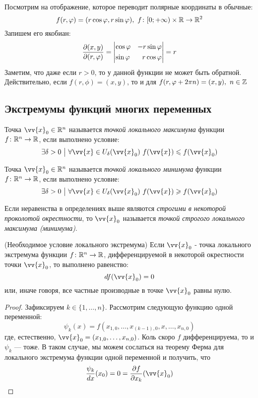 \begin{example}
	Посмотрим на отображение, которое переводит полярные координаты в обычные:
	\[
		f(r, \varphi) = (r\cos\varphi, r\sin\varphi),\ f \colon [0; +\infty) \times \mathbb{R} \to \mathbb{R}^2
	\]
	Запишем его якобиан:
	\[
		\frac{\partial (x, y)}{\partial (r, \varphi)} = \left|\begin{aligned}&{\cos\varphi} &{-r\sin\varphi} \\ &{\sin\varphi} &{r\cos\varphi}\end{aligned}\right| = r
	\]
	Заметим, что даже если $r > 0$, то у данной функции не может быть обратной. Действительно, если $f(r, \phi) = (x, y)$, то и для $f(r, \varphi + 2\pi n) = (x, y),\ n \in \mathbb{Z}$
\end{example}

\subsection{Экстремумы функций многих переменных}

\begin{definition}
	Точка $\vv{x}_0 \in \R^n$ называется \textit{точкой локального максимума} функции $f \colon \mathbb{R}^n \to \mathbb{R}$, если выполнено условие:
	\[
		\exists \delta > 0 \such \forall \vv{x} \in U_\delta(\vv{x}_0)\ f(\vv{x}) \le f(\vv{x}_0)
	\]
\end{definition}

\begin{definition}
	Точка $\vv{x}_0 \in \R^n$ называется \textit{точкой локального минимума} функции $f \colon \mathbb{R}^n \to \mathbb{R}$, если выполнено условие:
	\[
	\exists \delta > 0 \such \forall \vv{x} \in U_\delta(\vv{x}_0)\ f(\vv{x}) \ge f(\vv{x}_0)
	\]
\end{definition}

\begin{note}
	Если неравенства в определениях выше являются \textit{строгими в некоторой проколотой окрестности}, то $\vv{x}_0$ называется \textit{точкой строгого локального максимума (минимума)}.
\end{note}

\begin{theorem} (Необходимое условие локального экстремума)
	Если $\vv{x}_0$ - точка локального экстремума функции $f \colon \mathbb{R}^n \to \mathbb{R}$, дифференцируемой в некоторой окрестности точки $\vv{x}_0$, то выполнено равенство:
	\[
		df(\vv{x}_0) = 0
	\]
	или, иначе говоря, все частные производные в точке $\vv{x}_0$ равны нулю.
\end{theorem}

\begin{proof}
	Зафиксируем $k \in \{1, \ldots, n\}$. Рассмотрим следующую функцию одной переменной:
	\[
		\psi_k(x) = f(x_{1, 0}, \ldots, x_{(k - 1), 0}, x, \ldots, x_{n, 0})
	\]
	где, естественно, $\vv{x}_0 = (x_{1, 0}, \ldots, x_{n, 0})$. Коль скоро $f$ дифференцируема, то и $\psi_k$ --- тоже. В таком случае, мы можем сослаться на теорему Ферма для локального экстремума функции одной переменной и получить, что
	\[
		\frac{\psi_k}{dx}(x_0) = 0 = \pd{f}{x_k}(\vv{x}_0)
	\]
\end{proof}


